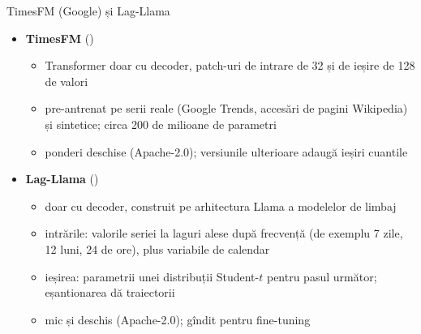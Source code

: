 \begin{frame}{TimesFM (Google) și Lag-Llama}
\itemsize{\footnotesize}
\begin{itemize}
    \item \textbf{TimesFM} ()
    \begin{itemize}
        \item Transformer doar cu decoder, patch-uri de intrare de 32 și de ieșire de 128 de valori
        \item pre-antrenat pe serii reale (Google Trends, accesări de pagini Wikipedia) și sintetice; circa 200 de milioane de parametri
        \item ponderi deschise (Apache-2.0); versiunile ulterioare adaugă ieșiri cuantile
    \end{itemize}
    \item \textbf{Lag-Llama} ()
    \begin{itemize}
        \item doar cu decoder, construit pe arhitectura Llama a modelelor de limbaj
        \item intrările: valorile seriei la laguri alese după frecvență (de exemplu 7 zile, 12 luni, 24 de ore), plus variabile de calendar
        \item ieșirea: parametrii unei distribuții Student-$t$ pentru pasul următor; eșantionarea dă traiectorii
        \item mic și deschis (Apache-2.0); gîndit pentru fine-tuning
    \end{itemize}
\end{itemize}
\end{frame}

